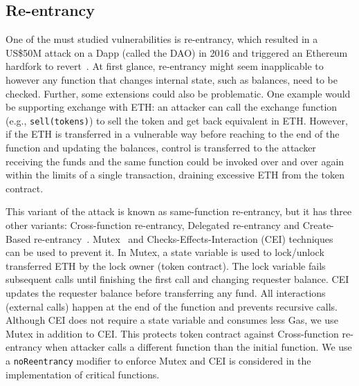 \subsection{Re-entrancy}
One of the must studied vulnerabilities is re-entrancy, which resulted in a US\$50M attack on a Dapp (called the DAO) in 2016 and triggered an Ethereum hardfork to revert~\cite{DAO1}. At first glance, re-entrancy might seem inapplicable to \erc however any function that changes internal state, such as balances, need to be checked. Further, some \erc extensions could also be problematic. One example would be supporting exchange with ETH: an attacker can call the exchange function (e.g., \texttt{sell(tokens)}) to sell the token and get back equivalent in ETH. However, if the ETH is transferred in a vulnerable way before reaching to the end of the function and updating the balances, control is transferred to the attacker receiving the funds and the same function could be invoked over and over again within the limits of a single transaction, draining excessive ETH from the token contract.


This variant of the attack is known as same-function re-entrancy, but it has three other variants: Cross-function re-entrancy, Delegated re-entrancy and Create-Based re-entrancy~\cite{SEREUM}. Mutex~\cite{WiKiMutex} and Checks-Effects-Interaction (CEI) techniques~\cite{SolidtyDocSec} can be used to prevent it. In Mutex, a state variable is used to lock/unlock transferred ETH by the lock owner (\ie token contract). The lock variable fails subsequent calls until finishing the first call and changing requester balance. CEI updates the requester balance before transferring any fund. All interactions (\ie external calls) happen at the end of the function and prevents recursive calls. Although CEI does not require a state variable and consumes less Gas, we use Mutex in addition to CEI. This protects token contract against Cross-function re-entrancy when attacker calls a different function than the initial function. We use a \texttt{noReentrancy} modifier to enforce Mutex and CEI is considered in the implementation of critical functions.


